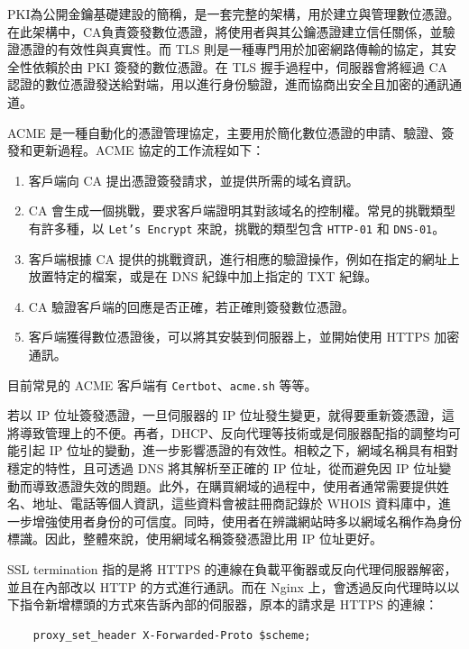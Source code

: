\documentclass[12pt]{article}
\newenvironment{problem}[2][Problem]{\begin{trivlist}
\item[\hskip \labelsep {\bfseries #1}\hskip \labelsep {\bfseries #2}]}{\end{trivlist}}
\begin{document}
\begin{problem}{1.3 (a)}
  PKI為公開金鑰基礎建設的簡稱，是一套完整的架構，用於建立與管理數位憑證。在此架構中，CA負責簽發數位憑證，將使用者與其公鑰憑證建立信任關係，並驗證憑證的有效性與真實性。而 TLS 則是一種專門用於加密網路傳輸的協定，其安全性依賴於由 PKI 簽發的數位憑證。在 TLS 握手過程中，伺服器會將經過 CA 認證的數位憑證發送給對端，用以進行身份驗證，進而協商出安全且加密的通訊通道。
\end{problem}

\begin{problem}{1.3 (b)}
  ACME 是一種自動化的憑證管理協定，主要用於簡化數位憑證的申請、驗證、簽發和更新過程。ACME 協定的工作流程如下：
  \begin{enumerate}
    \item 客戶端向 CA 提出憑證簽發請求，並提供所需的域名資訊。
    \item CA 會生成一個挑戰，要求客戶端證明其對該域名的控制權。常見的挑戰類型有許多種，以 \texttt{Let's Encrypt} 來說，挑戰的類型包含 \texttt{HTTP-01} 和 \texttt{DNS-01}。
    \item 客戶端根據 CA 提供的挑戰資訊，進行相應的驗證操作，例如在指定的網址上放置特定的檔案，或是在 DNS 紀錄中加上指定的 TXT 紀錄。
    \item CA 驗證客戶端的回應是否正確，若正確則簽發數位憑證。
    \item 客戶端獲得數位憑證後，可以將其安裝到伺服器上，並開始使用 HTTPS 加密通訊。
  \end{enumerate}
  目前常見的 ACME 客戶端有 \texttt{Certbot}、\texttt{acme.sh} 等等。
\end{problem}

\begin{problem}{1.3 (c)}

  若以 IP 位址簽發憑證，一旦伺服器的 IP 位址發生變更，就得要重新簽憑證，這將導致管理上的不便。再者，DHCP、反向代理等技術或是伺服器配指的調整均可能引起 IP 位址的變動，進一步影響憑證的有效性。相較之下，網域名稱具有相對穩定的特性，且可透過 DNS 將其解析至正確的 IP 位址，從而避免因 IP 位址變動而導致憑證失效的問題。此外，在購買網域的過程中，使用者通常需要提供姓名、地址、電話等個人資訊，這些資料會被註冊商記錄於 WHOIS 資料庫中，進一步增強使用者身份的可信度。同時，使用者在辨識網站時多以網域名稱作為身份標識。因此，整體來說，使用網域名稱簽發憑證比用 IP 位址更好。

\end{problem}

\begin{problem}{1.3 (d)}
  SSL termination 指的是將 HTTPS 的連線在負載平衡器或反向代理伺服器解密，並且在內部改以 HTTP 的方式進行通訊。而在 Nginx 上，會透過反向代理時以以下指令新增標頭的方式來告訴內部的伺服器，原本的請求是 HTTPS 的連線：
  \begin{verbatim}
    proxy_set_header X-Forwarded-Proto $scheme;
  \end{verbatim}
\end{problem}
\end{document}
